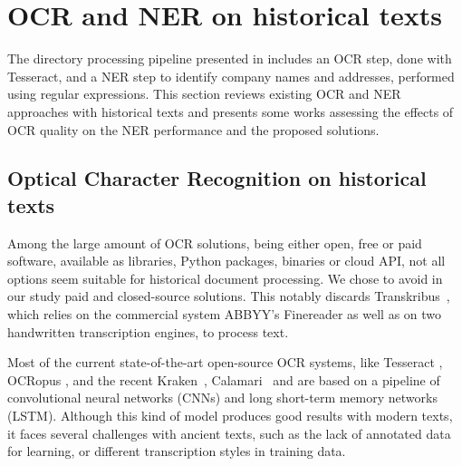 \section{OCR and NER on historical texts}
\label{sec:related-work}

The directory processing pipeline presented in \cite{bell2020automated} includes an OCR step, done with Tesseract, and a NER step to identify company names and addresses, performed using regular expressions.
This section reviews existing OCR and NER approaches with historical texts and presents some works assessing the effects of OCR quality on the NER performance and the proposed solutions. 

\subsection{Optical Character Recognition on historical texts}
Among the large amount of OCR solutions, being either open, free or paid software, available as libraries, Python packages, binaries or cloud API, not all options seem suitable for historical document processing.
We chose to avoid in our study paid and closed-source solutions.
This notably discards Transkribus~\cite{transkribus}, which relies on the commercial system ABBYY's Finereader as well as on two handwritten transcription engines, to process text.


Most of the current state-of-the-art open-source OCR systems, like Tesseract \cite{smith2007overview}, OCRopus \cite{breuel2008ocropus}, and the recent Kraken~\cite{kraken}, Calamari~\cite{wick_calamari_2020} and \peroocr \cite{kohut2021ts} are based on a pipeline of convolutional neural networks (CNNs) and long short-term memory networks (LSTM).
Although this kind of model produces good results with modern texts, it faces several challenges with ancient texts, such as the lack of annotated data for learning, or different transcription styles in training data.
%

